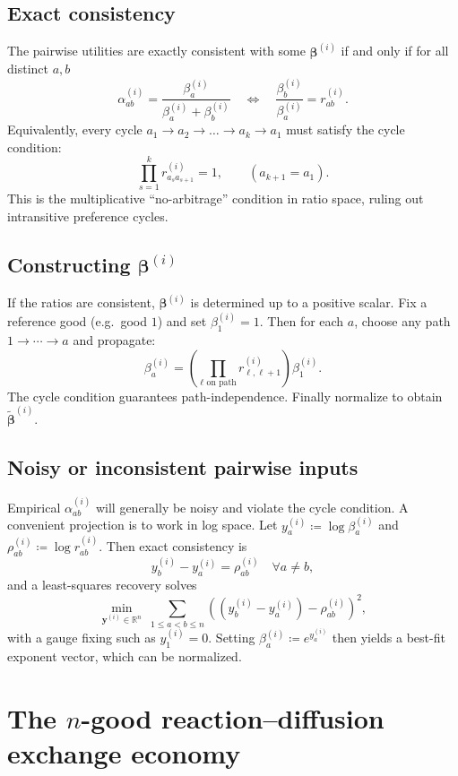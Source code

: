 \documentclass[11pt]{article}
\begin{document}
\subsection{Exact consistency}

The pairwise utilities are exactly consistent with some \(\bm{\beta}^{(i)}\) if and only if for all distinct \(a,b\)
\[
\alpha^{(i)}_{ab} = \frac{\beta_a^{(i)}}{\beta_a^{(i)}+\beta_b^{(i)}}
\quad\Longleftrightarrow\quad
\frac{\beta_b^{(i)}}{\beta_a^{(i)}} = r^{(i)}_{ab}.
\]
Equivalently, every cycle \(a_1 \to a_2 \to \dots \to a_k \to a_1\) must satisfy the cycle condition:
\[
\prod_{s=1}^{k} r^{(i)}_{a_s a_{s+1}} = 1,
\qquad (a_{k+1}=a_1).
\]
This is the multiplicative ``no-arbitrage'' condition in ratio space, ruling out intransitive preference cycles.

\subsection{Constructing \texorpdfstring{\(\bm{\beta}^{(i)}\)}{beta}}

If the ratios are consistent, \(\bm{\beta}^{(i)}\) is determined up to a positive scalar.
Fix a reference good (e.g.\ good \(1\)) and set \(\beta_1^{(i)} = 1\). Then for each \(a\),
choose any path \(1 \to \cdots \to a\) and propagate:
\[
\beta_a^{(i)} = \left(\prod_{\ell \text{ on path}} r^{(i)}_{\ell,\ell+1}\right)\beta_1^{(i)}.
\]
The cycle condition guarantees path-independence. Finally normalize to obtain \(\tilde{\bm{\beta}}^{(i)}\).

\subsection{Noisy or inconsistent pairwise inputs}

Empirical \(\alpha^{(i)}_{ab}\) will generally be noisy and violate the cycle condition. A convenient projection is to
work in log space. Let \(y_a^{(i)} \coloneqq \log \beta_a^{(i)}\) and
\(\rho^{(i)}_{ab} \coloneqq \log r^{(i)}_{ab}\). Then exact consistency is
\[
y_b^{(i)} - y_a^{(i)} = \rho^{(i)}_{ab}\quad \forall a\neq b,
\]
and a least-squares recovery solves
\[
\min_{\bm{y}^{(i)}\in\mathbb{R}^n}\;\sum_{1\le a<b\le n}\left((y_b^{(i)}-y_a^{(i)})-\rho^{(i)}_{ab}\right)^2,
\]
with a gauge fixing such as \(y_1^{(i)}=0\). Setting \(\beta_a^{(i)} \coloneqq e^{y_a^{(i)}}\) then yields a
best-fit exponent vector, which can be normalized.

\section{The \(n\)-good reaction--diffusion exchange economy}
\end{document}

